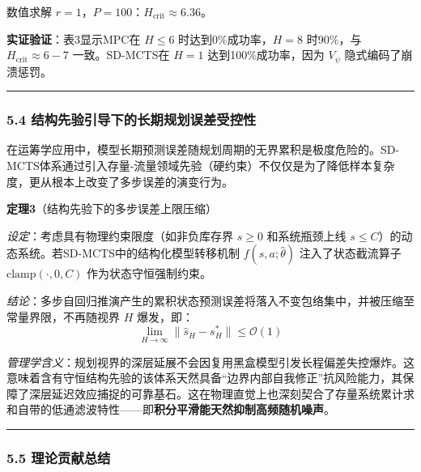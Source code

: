 \documentclass[UTF8]{ctexart}
\begin{document}
数值求解 \(r = 1\)，\(P = 100\)：\(H_{\text{crit}} \approx 6.36\)。

\textbf{实证验证}：表3显示MPC在 \(H \leq 6\) 时达到0\%成功率，\(H = 8\)
时90\%，与 \(H_{\text{crit}} \approx 6-7\) 一致。SD-MCTS在 \(H = 1\)
达到100\%成功率，因为 \(V_\psi\) 隐式编码了崩溃惩罚。

\begin{center}\rule{0.5\linewidth}{0.4pt}\end{center}

\hypertarget{ux7ed3ux6784ux5148ux9a8cux5f15ux5bfcux4e0bux7684ux957fux671fux89c4ux5212ux8befux5deeux53d7ux63a7ux6027}{%
\subsubsection{5.4
结构先验引导下的长期规划误差受控性}\label{ux7ed3ux6784ux5148ux9a8cux5f15ux5bfcux4e0bux7684ux957fux671fux89c4ux5212ux8befux5deeux53d7ux63a7ux6027}}

在运筹学应用中，模型长期预测误差随规划周期的无界累积是极度危险的。SD-MCTS体系通过引入存量-流量领域先验（硬约束）不仅仅是为了降低样本复杂度，更从根本上改变了多步误差的演变行为。

\textbf{定理3}（结构先验下的多步误差上限压缩）

\emph{设定}：考虑具有物理约束限度（如非负库存界 \(s \geq 0\)
和系统瓶颈上线 \(s \leq C\)）的动态系统。若SD-MCTS中的结构化模型转移机制
\(f(s,a;\hat{\theta})\) 注入了状态截流算子 \(\text{clamp}(\cdot, 0, C)\)
作为状态守恒强制约束。

\emph{结论}：多步自回归推演产生的累积状态预测误差将落入不变包络集中，并被压缩至常量界限，不再随视界
\(H\) 爆发，即：
\[ \lim_{H \to \infty} \| \hat{s}_H - s^*_H \| \leq \mathcal{O}(1) \]

\emph{管理学含义}：规划视界的深层延展不会因复用黑盒模型引发长程偏差失控爆炸。这意味着含有守恒结构先验的该体系天然具备``边界内部自我修正''抗风险能力，其保障了深层延迟效应捕捉的可靠基石。这在物理直觉上也深刻契合了存量系统累计求和自带的低通滤波特性——即\textbf{积分平滑能天然抑制高频随机噪声}。

\begin{center}\rule{0.5\linewidth}{0.4pt}\end{center}

\hypertarget{ux7406ux8bbaux8d21ux732eux603bux7ed3}{%
\subsubsection{5.5
理论贡献总结}\label{ux7406ux8bbaux8d21ux732eux603bux7ed3}}
\end{document}
